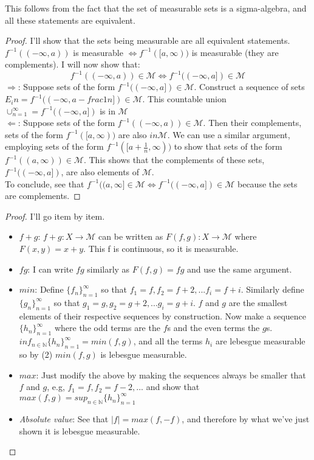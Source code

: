 \documentclass[12pt]{article}
\newenvironment{problem}[2][Problem]{\begin{trivlist}
\item[\hskip \labelsep {\bfseries #1}\hskip \labelsep {\bfseries #2.}]}{\end{trivlist}}
\theoremstyle{definition}
\theoremstyle{definition}
\theoremstyle{definition}
\theoremstyle{definition}
\begin{document}
\begin{problem}{3.4}
This follows from the fact that the set of measurable sets is a sigma-algebra, and all these statements are equivalent.
\begin{proof}
I'll show that the sets being measurable are all equivalent statements. \\
$f^{-1}((-\infty, a))$ is measurable $\iff f^{-1}([a, \infty))$ is measurable (they are complements). I will now show that: 
$$ f^{-1}((-\infty, a)) \in \mathcal{M} \iff f^{-1}((-\infty, a]) \in \mathcal{M} $$
$\Rightarrow$: Suppose sets of the form $f^{-1}((-\infty, a]) \in \mathcal{M}$. Construct a sequence of sets $E_in = f^{-1}((-\infty, a - frac{1}{n}]) \in \mathcal{M} $. This countable union $\cup_{n=1}^\infty = f^{-1}((-\infty, a])$ is in $\mathcal{M}$ \\
$\Leftarrow$: Suppose sets of the form $f^{-1}((-\infty, a)) \in \mathcal{M}$. Then their complements, sets of the form $f^{-1} ([a, \infty))$ are also $in \mathcal{M}$. We can use a similar argument, employing sets of the form $f^{-1}([ a + \frac{1}{n}, \infty))$ to show that sets of the form $f^{-1}((a, \infty)) \in \mathcal{M}$. This shows that the complements of these sets, $f^{-1}((-\infty, a])$, are also elements of $\mathcal{M}$. \\
To conclude, see that $f^{-1}((a, \infty] \in \mathcal{M} \iff f^{-1}((-\infty, a]) \in \mathcal{M}$ because the sets are complements.
\end{proof} 
\end{problem}

\begin{problem}{3.7}
\begin{proof} I'll go item by item.
\begin{itemize}
\item $f+g$: $f+g: X \to \mathcal{M}$ can be written as $F(f , g): X \to \mathcal{M}$ where $F(x, y) = x + y$. This f is continuous, so it is measurable. 
\item $fg$: I can write $fg$ similarly as $F(f, g) = fg$ and use the same argument.
\item $min$: Define $\{f_n\}_{n=1}^\infty$ so that $f_1 = f, f_2 = f+2,... f_i = f+i$. Similarly define $\{g_n\}_{n=1}^\infty$ so that $g_1 = g, g_2 = g+2,... g_i = g+i$. $f$ and $g$ are the smallest elements of their respective sequences by construction. Now make a sequence $\{h_n\}_{n=1}^\infty$ where the odd terms are the $f$s and the even terms the $g$s. $inf_{n\in\mathbb{N}}\{h_n\}_{n=1}^\infty = min(f, g)$, and all the terms $h_i$ are lebesgue measurable so by (2) $min(f, g)$ is lebesgue measurable.
\item $max$: Just modify the above by making the sequences always be smaller that $f$ and $g$, e.g, $f_1 = f, f_2 = f - 2, ...$ and show that $max(f, g) = sup_{n\in\mathbb{N}}\{h_n\}_{n=1}^\infty$
\item \textit{Absolute value}: See that $|f| = max(f, -f)$, and therefore by what we've just shown it is lebesgue measurable.
\end{itemize}
\end{proof}
\end{problem}
\end{document}
